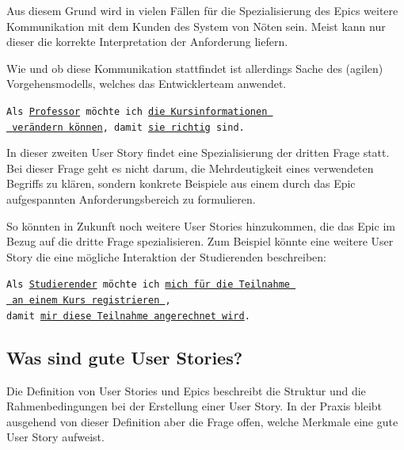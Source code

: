 \documentclass[acmtog]{acmart}
\begin{document}
Aus diesem Grund wird in vielen Fällen für die Spezialisierung des Epics weitere Kommunikation
mit dem Kunden des System von Nöten sein.
Meist kann nur dieser die korrekte Interpretation der Anforderung liefern.

Wie und ob diese Kommunikation stattfindet ist allerdings Sache des (agilen) Vorgehensmodells, welches
das Entwicklerteam anwendet.

\vspace{1em}
\texttt{Als \underline{Professor} möchte ich \underline{die Kursinformationen }\\
	\hspace*{4.5em} \underline{ verändern können}, damit \underline{sie richtig} sind.}
\vspace{1em}

In dieser zweiten User Story findet eine Spezialisierung der dritten Frage statt.
Bei dieser Frage geht es nicht darum, die Mehrdeutigkeit eines verwendeten Begriffs zu klären,
sondern konkrete Beispiele aus einem durch das Epic aufgespannten Anforderungsbereich
zu formulieren.

So könnten in Zukunft noch weitere User Stories hinzukommen, die das Epic im Bezug auf die dritte
Frage spezialisieren.
Zum Beispiel könnte eine weitere User Story die eine mögliche Interaktion der Studierenden beschreiben:

\vspace{1em}
\texttt{Als \underline{Studierender} möchte ich \underline{mich für die Teilnahme }\\
	\hspace*{2em}\underline{ an einem Kurs registrieren },\\
	\hspace*{4em}damit \underline{mir diese Teilnahme angerechnet wird}.}
\vspace{1em}

\subsection{Was sind gute User Stories?}
Die Definition von User Stories und Epics beschreibt die Struktur und die Rahmenbedingungen bei der Erstellung einer User Story.
In der Praxis bleibt ausgehend von dieser Definition aber die Frage offen, welche Merkmale eine gute User Story aufweist.
\end{document}
